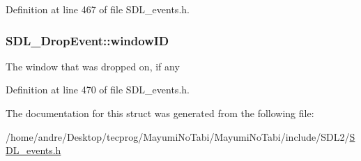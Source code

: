Definition at line 467 of file S\-D\-L\-\_\-events.\-h.

\hypertarget{struct_s_d_l___drop_event_a8cecd2178cdc04118bf852e7cf7bf647}{
\subsubsection[{window\-I\-D}]{ S\-D\-L\-\_\-\-Drop\-Event\-::window\-I\-D}}\label{struct_s_d_l___drop_event_a8cecd2178cdc04118bf852e7cf7bf647}
The window that was dropped on, if any 

Definition at line 470 of file S\-D\-L\-\_\-events.\-h.



The documentation for this struct was generated from the following file\-:\begin{DoxyCompactItemize}
\item 
/home/andre/\-Desktop/tecprog/\-Mayumi\-No\-Tabi/\-Mayumi\-No\-Tabi/include/\-S\-D\-L2/\hyperlink{_s_d_l__events_8h}{S\-D\-L\-\_\-events.\-h}\end{DoxyCompactItemize}
